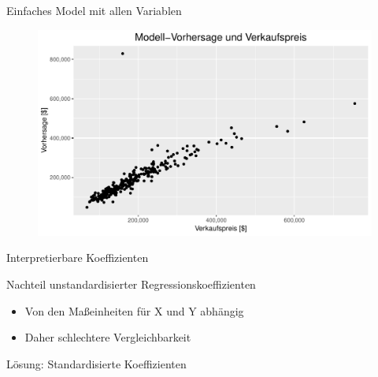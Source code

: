 \documentclass[10pt]{beamer}
\begin{document}
\begin{frame}{Einfaches Model mit allen Variablen}
	
	\begin{figure}
		\includegraphics[width=\textwidth, keepaspectratio]{figures/simple_model}
	\end{figure}
	
\end{frame}


\begin{frame}{Interpretierbare Koeffizienten}
	
	\begin{Large}{Nachteil unstandardisierter Regressionskoeffizienten}\end{Large}
	
	  \begin{itemize}
		\item Von den Maßeinheiten für X und Y abhängig
		\item Daher schlechtere Vergleichbarkeit
	  \end{itemize}
	 
	\begin{Large}{Lösung: Standardisierte Koeffizienten}\end{Large}
	
\end{frame}
\end{document}
